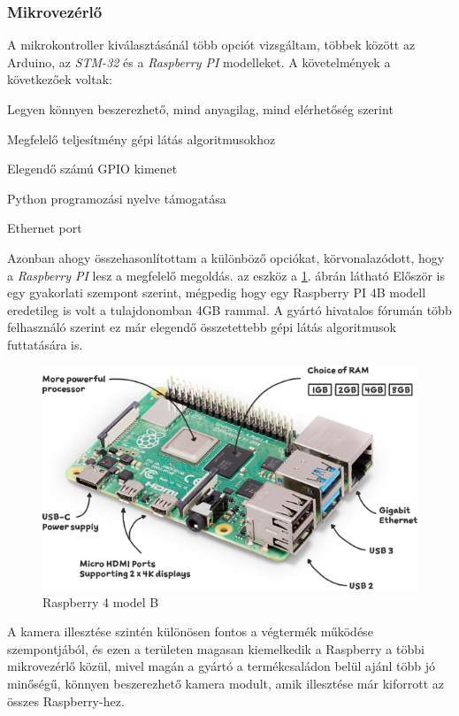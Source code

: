 \documentclass[12pt,a4paper]{article}
\begin{document}
\subsubsection*{Mikrovezérlő}
A mikrokontroller kiválasztásánál több opciót vizsgáltam, többek között az {Arduino}, az \textsl{STM-32} és a \textsl{Raspberry PI} modelleket. A követelmények a következőek voltak:

\begin{list}{-}{}
	\item Legyen könnyen beszerezhető, mind anyagilag, mind elérhetőség szerint
	\item Megfelelő teljesítmény gépi látás algoritmusokhoz
	\item Elegendő számú GPIO kimenet
	\item Python programozási nyelve támogatása
	\item Ethernet port
\end{list}

Azonban ahogy összehasonlítottam a különböző opciókat, körvonalazódott, hogy a \textsl{Raspberry PI} lesz a megfelelő megoldás. az eszköz a \ref{fig:elek_raspberry4b}. ábrán látható Először is egy gyakorlati szempont szerint, mégpedig hogy egy Raspberry PI 4B modell eredetileg is volt a tulajdonomban 4GB rammal. A gyártó hivatalos fórumán több felhasználó szerint ez már elegendő összetettebb gépi látás algoritmusok futtatására is. \cite{4gbforum} \\

\begin{figure}[h!]
	\centering
	\includegraphics[width=1\linewidth]{elek_raspberry4b}
	\caption{Raspberry 4 model B}
	\label{fig:elek_raspberry4b}
\end{figure}

A kamera illesztése szintén különösen fontos a végtermék működése szempontjából, és ezen a területen magasan kiemelkedik a Raspberry a többi mikrovezérlő közül, mivel magán a gyártó a termékcsaládon belül ajánl több jó minőségű, könnyen beszerezhető kamera modult, amik illesztése már kiforrott az összes Raspberry-hez.\\
\end{document}
